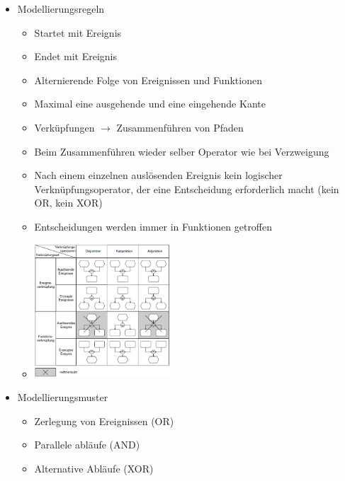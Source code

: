 \documentclass[11pt,a4paper]{article}
\begin{document}
\begin{itemize}
	\item Modellierungsregeln
	 	\begin{itemize}
	 	\item Startet mit Ereignis
	 	\item Endet mit Ereignis
	 	\item Alternierende Folge von Ereignissen und Funktionen
	 	\item Maximal eine ausgehende und eine eingehende Kante
	 	\item Verküpfungen $\rightarrow$ Zusammenführen von Pfaden
	 	\item Beim Zusammenführen wieder selber Operator wie bei Verzweigung
	 	\item Nach einem einzelnen auslösenden Ereignis kein logischer Verknüpfungsoperator, der eine Entscheidung erforderlich macht (kein OR, 	
	 		  kein XOR)
	 	\item Entscheidungen werden immer in Funktionen getroffen
	 	\item[] \includegraphics[height=5cm]{rulesaris}
	 	\end{itemize}
	 	
	 \item Modellierungsmuster
	 	\begin{itemize}
	 	\item Zerlegung von Ereignissen (OR)
	 	\item Parallele abläufe (AND)
	 	\item Alternative Abläufe (XOR)
	 	\end{itemize}
			
\end{itemize}
\end{document}
